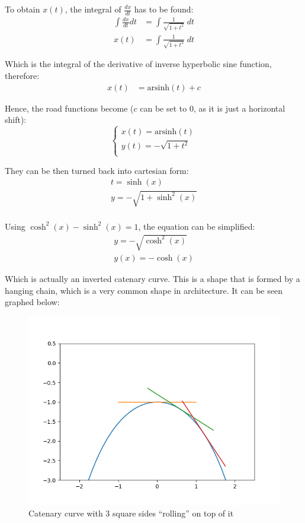 \documentclass[12pt]{article}
\begin{document}
        To obtain $x(t)$, the integral of $\frac{dx}{dt}$ has to be found:
        \begin{align}
            \int \frac{dx}{dt} dt &= \int \frac{1}{\sqrt{1+t^2}} \;dt \\
            x(t) &= \int \frac{1}{\sqrt{1+t^2}} \;dt
        \end{align}

        Which is the integral of the derivative of inverse hyperbolic sine function\cite{oxford_dict}, therefore:
        \begin{align}
            x(t) &= \text{arsinh}(t) + c 
        \end{align}

        Hence, the road functions become ($c$ can be set to 0, as it is just a horizontal shift):
        \begin{equation}\label{eq:road_2}
            \begin{cases}
                x(t) = \text{arsinh}(t) \\
                y(t) = -\sqrt{1+t^2} \\
            \end{cases}
        \end{equation}

        They can be then turned back into cartesian form:
        \begin{align}
            t = \sinh(x) \\
            y = -\sqrt{1+\sinh^2(x)} \\ 
        \end{align}

        Using $\cosh^2(x) - \sinh^2(x) = 1$\cite{oxford_dict}, the equation can be simplified:
        \begin{align}
            y = -\sqrt{\cosh^2(x)} \\
            y(x) = -\cosh(x)
        \end{align}

        Which is actually an inverted catenary curve. This is a shape that is formed by a hanging chain, which is a very common shape in architecture. It can be seen graphed below:
        
        \begin{figure}[H]
            \centering
            \includegraphics[width=0.8\linewidth]{images/cosh_many.png}
            \caption{Catenary curve with 3 square sides ``rolling'' on top of it}\label{fig:cosh}
        \end{figure}
\end{document}
